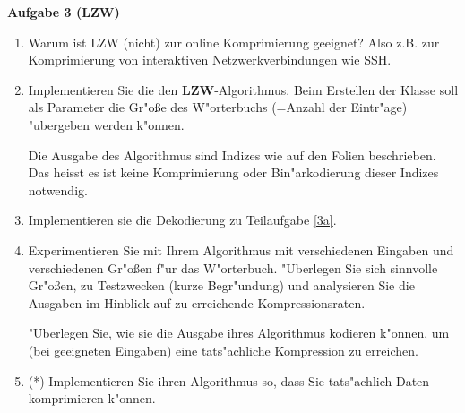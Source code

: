 \documentclass[a4paper]{article}
\begin{document}
\bigskip

{\bf Aufgabe 3  \quad(LZW)}\\
\begin{enumerate}
\item Warum ist LZW (nicht) zur online Komprimierung geeignet? Also z.B. zur Komprimierung von interaktiven Netzwerkverbindungen wie SSH.
\item\label{3a} Implementieren Sie die den {\bf LZW}-Algorithmus. Beim Erstellen der Klasse soll als Parameter die Gr"o{\ss}e des W"orterbuchs (=Anzahl der Eintr"age) "ubergeben werden k"onnen.

Die Ausgabe des Algorithmus sind Indizes wie auf den Folien beschrieben. Das heisst es ist keine Komprimierung oder Bin"arkodierung dieser Indizes notwendig.

\item Implementieren sie die Dekodierung zu Teilaufgabe \ref{3a}.
\item Experimentieren Sie mit Ihrem Algorithmus mit verschiedenen Eingaben und verschiedenen Gr"o{\ss}en f"ur das W"orterbuch. "Uberlegen Sie sich sinnvolle Gr"o{\ss}en, zu Testzwecken (kurze Begr"undung) und analysieren Sie die Ausgaben im Hinblick auf zu erreichende Kompressionsraten.

"Uberlegen Sie, wie sie die Ausgabe ihres Algorithmus kodieren k"onnen, um (bei geeigneten Eingaben) eine tats"achliche Kompression zu erreichen.

\item(*) Implementieren Sie ihren Algorithmus so, dass Sie tats"achlich Daten komprimieren k"onnen.
\end{enumerate}
\end{document}
